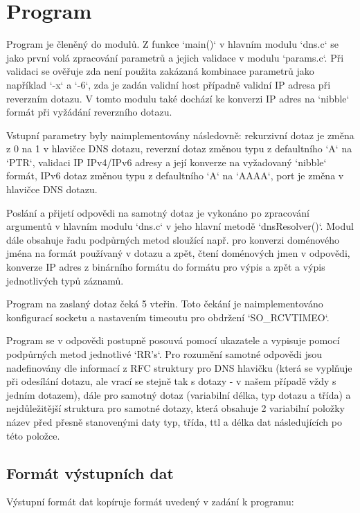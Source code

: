 \documentclass[a4paper,11pt]{article}
\begin{document}
\section{Program}

Program je členěný do modulů. Z funkce `main()` v hlavním modulu `dns.c` se jako první volá zpracování parametrů a jejich validace v modulu `params.c`. Při validaci se ověřuje zda není použita zakázaná kombinace parametrů jako například `-x` a `-6`, zda je zadán validní host případně validní IP adresa při reverzním dotazu. V tomto modulu také dochází ke konverzi IP adres na `nibble` formát při vyžádání reverzního dotazu.

Vstupní parametry byly naimplementovány následovně: rekurzivní dotaz je změna z 0 na 1 v hlavičce DNS dotazu, reverzní dotaz změnou typu z defaultního `A` na `PTR`, validaci IP IPv4/IPv6 adresy a její konverze na vyžadovaný `nibble` formát, IPv6 dotaz změnou typu z defaultního `A` na `AAAA`, port je změna v hlavičce DNS dotazu.

Poslání a přijetí odpovědi na samotný dotaz je vykonáno po zpracování argumentů v hlavním modulu `dns.c` v jeho hlavní metodě `dnsResolver()`. Modul dále obsahuje řadu podpůrných metod sloužící např. pro konverzi doménového jména na formát používaný v dotazu a zpět, čtení doménových jmen v odpovědi, konverze IP adres z binárního formátu do formátu pro výpis a zpět a výpis jednotlivých typů záznamů.

Program na zaslaný dotaz čeká 5 vteřin. Toto čekání je naimplementováno konfigurací socketu a nastavením timeoutu pro obdržení `SO\_RCVTIMEO`.

Program se v odpovědi postupně posouvá pomocí ukazatele a vypisuje pomocí podpůrných metod jednotlivé `RR's`. Pro rozumění samotné odpovědi jsou nadefinovány dle informací z RFC struktury pro DNS hlavičku (která se vyplňuje při odesílání dotazu, ale vrací se stejně tak s dotazy - v našem případě vždy s jedním dotazem), dále pro samotný dotaz (variabilní délka, typ dotazu a třída) a nejdůležitější struktura pro samotné dotazy, která obsahuje 2 variabilní položky název před přesně stanovenými daty typ, třída, ttl a délka dat následujících po této položce. 

\subsection{Formát výstupních dat}

Výstupní formát dat kopíruje formát uvedený v zadání k programu:
\end{document}
